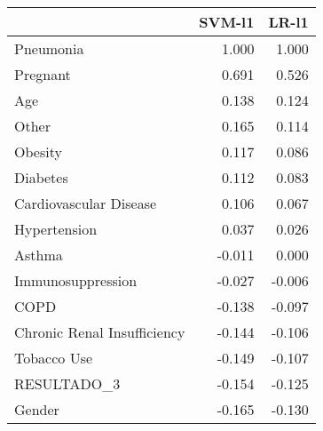 \begin{tabular}{lrr}
\toprule
{} &  SVM-l1 &  LR-l1 \\
\midrule
Pneumonia                   &   1.000 &  1.000 \\
Pregnant                    &   0.691 &  0.526 \\
Age                         &   0.138 &  0.124 \\
Other                       &   0.165 &  0.114 \\
Obesity                     &   0.117 &  0.086 \\
Diabetes                    &   0.112 &  0.083 \\
Cardiovascular Disease      &   0.106 &  0.067 \\
Hypertension                &   0.037 &  0.026 \\
Asthma                      &  -0.011 &  0.000 \\
Immunosuppression           &  -0.027 & -0.006 \\
COPD                        &  -0.138 & -0.097 \\
Chronic Renal Insufficiency &  -0.144 & -0.106 \\
Tobacco Use                 &  -0.149 & -0.107 \\
RESULTADO\_3                 &  -0.154 & -0.125 \\
Gender                      &  -0.165 & -0.130 \\
\bottomrule
\end{tabular}
